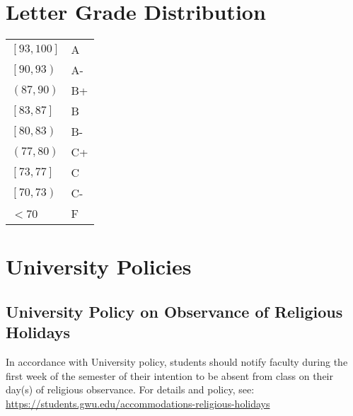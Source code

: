 \documentclass[pdftex,11pt]{artikel3}
\begin{document}
\section{Letter Grade Distribution}
\begin{tabular}{ l l}
$[93, 100]$ & A\\
$\left[90, 93 \right)$  & A-\\
$\left(87, 90 \right)$  & B+\\
$\left[83, 87 \right]$  & B\\
$\left[80, 83 \right)$  & B-\\
$\left(77, 80 \right)$ & C+\\ 
$\left[73, 77 \right]$ & C\\
$\left[70, 73 \right)$ & C-\\
$<$70    & F\\  
\end{tabular}

\section{University Policies}

\subsection{University Policy on Observance of Religious Holidays}
In accordance with University policy, students should notify faculty during the first week of the semester of their intention to be absent from class on their day(s) of religious observance. For details and policy, see: \url{https://students.gwu.edu/accommodations-religious-holidays}
\end{document}

